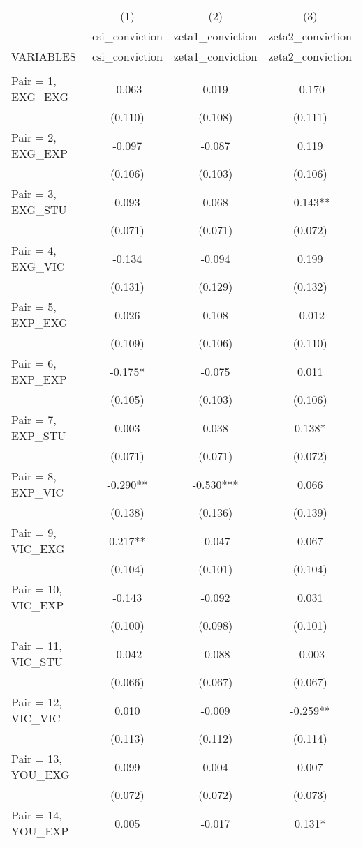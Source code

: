 \documentclass[]{article}
\begin{document}
\begin{tabular}{lccc} \hline
 & (1) & (2) & (3) \\
 & csi\_conviction & zeta1\_conviction & zeta2\_conviction \\
VARIABLES & csi\_conviction & zeta1\_conviction & zeta2\_conviction \\ \hline
 &  &  &  \\
Pair = 1, EXG\_EXG & -0.063 & 0.019 & -0.170 \\
 & (0.110) & (0.108) & (0.111) \\
Pair = 2, EXG\_EXP & -0.097 & -0.087 & 0.119 \\
 & (0.106) & (0.103) & (0.106) \\
Pair = 3, EXG\_STU & 0.093 & 0.068 & -0.143** \\
 & (0.071) & (0.071) & (0.072) \\
Pair = 4, EXG\_VIC & -0.134 & -0.094 & 0.199 \\
 & (0.131) & (0.129) & (0.132) \\
Pair = 5, EXP\_EXG & 0.026 & 0.108 & -0.012 \\
 & (0.109) & (0.106) & (0.110) \\
Pair = 6, EXP\_EXP & -0.175* & -0.075 & 0.011 \\
 & (0.105) & (0.103) & (0.106) \\
Pair = 7, EXP\_STU & 0.003 & 0.038 & 0.138* \\
 & (0.071) & (0.071) & (0.072) \\
Pair = 8, EXP\_VIC & -0.290** & -0.530*** & 0.066 \\
 & (0.138) & (0.136) & (0.139) \\
Pair = 9, VIC\_EXG & 0.217** & -0.047 & 0.067 \\
 & (0.104) & (0.101) & (0.104) \\
Pair = 10, VIC\_EXP & -0.143 & -0.092 & 0.031 \\
 & (0.100) & (0.098) & (0.101) \\
Pair = 11, VIC\_STU & -0.042 & -0.088 & -0.003 \\
 & (0.066) & (0.067) & (0.067) \\
Pair = 12, VIC\_VIC & 0.010 & -0.009 & -0.259** \\
 & (0.113) & (0.112) & (0.114) \\
Pair = 13, YOU\_EXG & 0.099 & 0.004 & 0.007 \\
 & (0.072) & (0.072) & (0.073) \\
Pair = 14, YOU\_EXP & 0.005 & -0.017 & 0.131* \\

\end{tabular}
\end{document}
